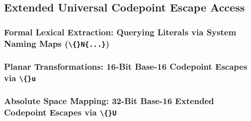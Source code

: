 \subsection{Extended Universal Codepoint Escape Access}
\subsubsection{Formal Lexical Extraction: Querying Literals via System Naming Maps (\texttt{\textbackslash\{\}N\{...\}})}
\subsubsection{Planar Transformations: 16-Bit Base-16 Codepoint Escapes via \texttt{\textbackslash\{\}u}}
\subsubsection{Absolute Space Mapping: 32-Bit Base-16 Extended Codepoint Escapes via \texttt{\textbackslash\{\}U}}
